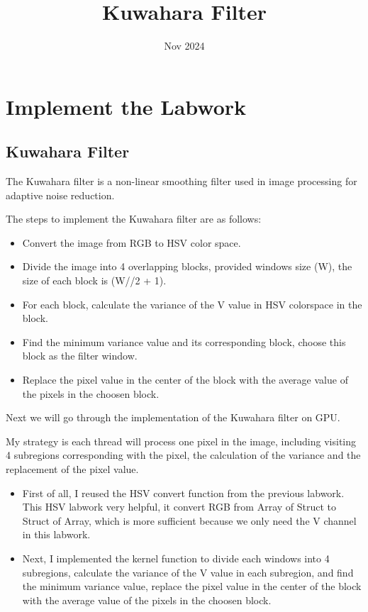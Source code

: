 \documentclass{article}
\begin{document}
\title{Kuwahara Filter}
\date{Nov 2024}

\section{Implement the Labwork}
\subsection{Kuwahara Filter}
The Kuwahara filter is a non-linear smoothing filter used in image processing for adaptive noise reduction.

The steps to implement the Kuwahara filter are as follows:
\begin{itemize}
    \item Convert the image from RGB to HSV color space.
    \item Divide the image into 4 overlapping blocks, provided windows size (W), the size of each block is (W//2 + 1).
    \item For each block, calculate the variance of the V value in HSV colorspace in the block.
    \item Find the minimum variance value and its corresponding block, choose this block as the filter window.
    \item Replace the pixel value in the center of the block with the average value of the pixels in the choosen block.
\end{itemize}

Next we will go through the implementation of the Kuwahara filter on GPU.

My strategy is each thread will process one pixel in the image, including visiting 4 subregions corresponding with the pixel, the calculation of the variance and the replacement of the pixel value.
\begin{itemize}
    \item First of all, I reused the HSV convert function from the previous labwork. This HSV labwork very helpful, it convert RGB from Array of Struct to Struct of Array, which is more sufficient because we only need the V channel in this labwork.
    \item Next, I implemented the kernel function to divide each windows into 4 subregions, calculate the variance of the V value in each subregion, and find the minimum variance value, replace the pixel value in the center of the block with the average value of the pixels in the choosen block.
\end{itemize}
\end{document}
